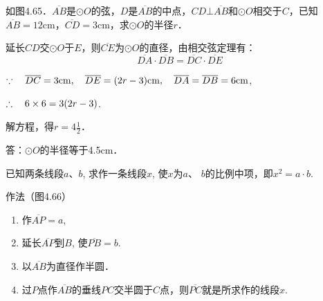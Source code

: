   
  \begin{example}
    如图4.65．$\overline{AB}$是$\odot O$的弦，$D$是$\overline{AB}$的中点，$CD\bot \overline{AB}$和$\odot O$相交于$C$，已知$\overline{AB}=12$cm，$\overline{CD}=3$cm，求$\odot O$的半径$r$．
  \end{example}
  
  \begin{solution}
  延长$CD$交$\odot O$于$E$，则$\overline{CE}$为$\odot O$的直径，由相交弦定理有：
  \[\overline{DA}\cdot \overline{DB}=\overline{DC}\cdot \overline{DE}\]
  
  $\because\quad \overline{DC}=3{\rm cm},\quad  \overline{DE}=(2r-3){\rm cm},\quad \overline{DA}=\overline{DB}=6{\rm cm}$,
  
  $\therefore\quad 6\times6=3(2r-3)$.
  
  解方程，得$r=4\frac{1}{2}$．
  
  答：$\odot O$的半径等于4.5cm．
  \end{solution}
  
  \begin{example}
    已知两条线段$a$、$b$, 求作一条线段$x$, 使$x$为$a$、
$b$的比例中项，即$x^2=a\cdot b$.
\end{example}

作法（图4.66）
\begin{enumerate}
    \item 作$\overline{AP}=a$,
    \item 延长$\overline{AP}$到$B$, 使$\overline{PB}=b$.
    \item 以$\overline{AB}$为直径作半圆．
    \item 过$P$点作$\overline{AB}$的垂线$PC$交半圆于$C$点，则$\overline{PC}$就是所求作的线段$x$.
\end{enumerate}

\begin{figure}[htp]
    \centering
{}
    \caption{}
\end{figure}



